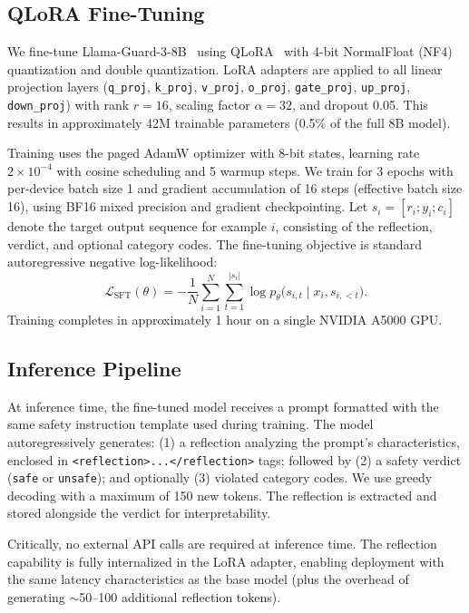 \documentclass[Superintelligence,article,submit,pdftex,moreauthors]{Definitions/mdpi}
\begin{document}
\subsection{QLoRA Fine-Tuning}

We fine-tune Llama-Guard-3-8B~\citep{metallamaguard3} using QLoRA~\citep{dettmers2024qlora} with 4-bit NormalFloat (NF4) quantization and double quantization. LoRA adapters are applied to all linear projection layers (\texttt{q\_proj}, \texttt{k\_proj}, \texttt{v\_proj}, \texttt{o\_proj}, \texttt{gate\_proj}, \texttt{up\_proj}, \texttt{down\_proj}) with rank $r = 16$, scaling factor $\alpha = 32$, and dropout 0.05. This results in approximately 42M trainable parameters (0.5\% of the full 8B model).

Training uses the paged AdamW optimizer with 8-bit states, learning rate $2 \times 10^{-4}$ with cosine scheduling and 5 warmup steps. We train for 3 epochs with per-device batch size 1 and gradient accumulation of 16 steps (effective batch size 16), using BF16 mixed precision and gradient checkpointing. Let $s_i = [r_i; y_i; c_i]$ denote the target output sequence for example $i$, consisting of the reflection, verdict, and optional category codes. The fine-tuning objective is standard autoregressive negative log-likelihood:
\begin{equation}
  \mathcal{L}_{\text{SFT}}(\theta) = - \frac{1}{N} \sum_{i=1}^{N} \sum_{t=1}^{|s_i|}
  \log p_{\theta}\bigl(s_{i,t} \mid x_i, s_{i,<t}\bigr).
\end{equation}
Training completes in approximately 1 hour on a single NVIDIA A5000 GPU.

\subsection{Inference Pipeline}

At inference time, the fine-tuned model receives a prompt formatted with the same safety instruction template used during training. The model autoregressively generates: (1) a reflection analyzing the prompt's characteristics, enclosed in \texttt{<reflection>...</reflection>} tags; followed by (2) a safety verdict (\texttt{safe} or \texttt{unsafe}); and optionally (3) violated category codes. We use greedy decoding with a maximum of 150 new tokens. The reflection is extracted and stored alongside the verdict for interpretability.

Critically, no external API calls are required at inference time. The reflection capability is fully internalized in the LoRA adapter, enabling deployment with the same latency characteristics as the base model (plus the overhead of generating $\sim$50--100 additional reflection tokens).
\end{document}
